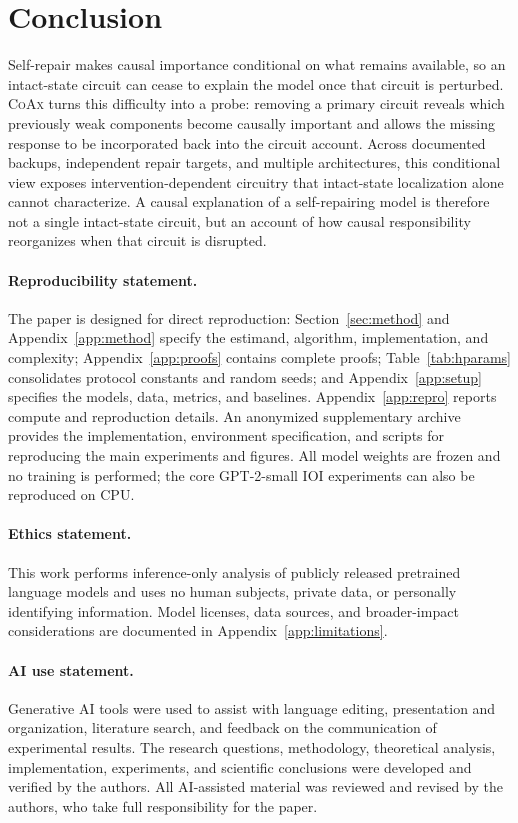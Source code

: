 \documentclass{article} %
\theoremstyle{plain}
\theoremstyle{definition}
\newcommand{\coax}{\textsc{CoAx}\xspace}
\begin{document}
\section{Conclusion}
Self-repair makes causal importance conditional on what remains available, so an intact-state circuit can cease to explain the model once that circuit is perturbed.
\coax turns this difficulty into a probe: removing a primary circuit reveals which previously weak components become causally important and allows the missing response to be incorporated back into the circuit account.
Across documented backups, independent repair targets, and multiple architectures, this conditional view exposes intervention-dependent circuitry that intact-state localization alone cannot characterize.
A causal explanation of a self-repairing model is therefore not a single intact-state circuit, but an account of how causal responsibility reorganizes when that circuit is disrupted.

\clearpage
\paragraph*{Reproducibility statement.}
The paper is designed for direct reproduction: Section~\ref{sec:method} and Appendix~\ref{app:method} specify the estimand, algorithm, implementation, and complexity; Appendix~\ref{app:proofs} contains complete proofs; Table~\ref{tab:hparams} consolidates protocol constants and random seeds; and Appendix~\ref{app:setup} specifies the models, data, metrics, and baselines.
Appendix~\ref{app:repro} reports compute and reproduction details.
An anonymized supplementary archive provides the implementation, environment specification, and scripts for reproducing the main experiments and figures.
All model weights are frozen and no training is performed; the core GPT-2-small IOI experiments can also be reproduced on CPU.

\paragraph*{Ethics statement.}
This work performs inference-only analysis of publicly released pretrained language models and uses no human subjects, private data, or personally identifying information.
Model licenses, data sources, and broader-impact considerations are documented in Appendix~\ref{app:limitations}.

\paragraph*{AI use statement.}
Generative AI tools were used to assist with language editing, presentation and organization, literature search, and feedback on the communication of experimental results.
The research questions, methodology, theoretical analysis, implementation, experiments, and scientific conclusions were developed and verified by the authors.
All AI-assisted material was reviewed and revised by the authors, who take full responsibility for the paper.




\clearpage
\appendix

\end{document}
